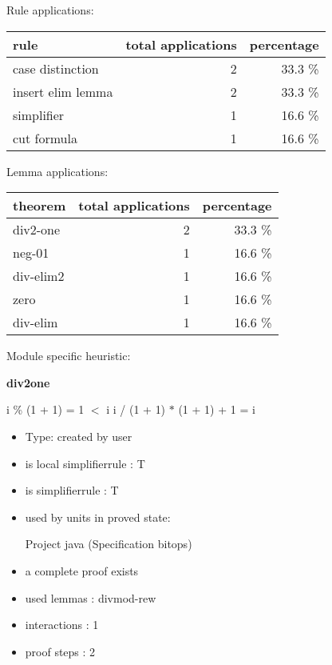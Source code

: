 \documentclass[a4paper]{article}
\begin{document}
Rule applications:

\begin{supertabular}{l|r|r}
rule	        & total applications & percentage \\ \hline
case distinction & 2 & 33.3 \% \\
insert elim lemma & 2 & 33.3 \% \\
simplifier & 1 & 16.6 \% \\
cut formula & 1 & 16.6 \% \\

\end{supertabular}

Lemma applications:

\begin{supertabular}{l|r|r}
theorem	        & total applications & percentage \\ \hline
div2-one & 2 & 33.3 \% \\
neg-01 & 1 & 16.6 \% \\
div-elim2 & 1 & 16.6 \% \\
zero & 1 & 16.6 \% \\
div-elim & 1 & 16.6 \% \\

\end{supertabular}

Module specific heuristic:

\pagebreak

{\LARGE\bf div2one}\label{lemma-div2one}

\medskip

 \Fol i \% (1 + 1) = 1  $<$ i \Imp i / (1 + 1) $*$ (1 + 1) + 1 = i

\begin{itemize}

\item Type: created by user

\item is local simplifierrule : T
\item is simplifierrule : T
\item used by units in proved state:

Project java (Specification bitops)
\item       a complete proof exists
\item       used lemmas  : divmod-rew
\item       interactions : 1
\item       proof steps  : 2
\end{itemize}
\end{document}
